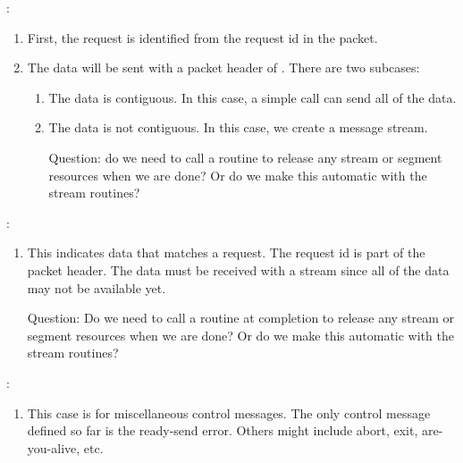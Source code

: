 :
\begin{enumerate}
\item First, the request is identified from the request id in the packet.

\item The data will be sent with a packet header of
  .  There are two subcases:
  \begin{enumerate}
  \item The data is contiguous.  In this case, a simple 
    call can send all of the data.

  \item The data is not contiguous.  In this case, we create a message
    stream.  

   Question: do we need to call a routine to release any stream or segment
   resources when we are done?  Or do we make this automatic with the stream
   routines? 

  \end{enumerate}
\end{enumerate}

:
\begin{enumerate}
\item This indicates data that matches a request.  The request id is part of
  the packet header.  The data must be received with a stream since all of the
  data may not be available yet.  

  Question: Do we need to call a routine at completion to release any stream
  or segment resources when we are done? Or do we make this automatic with the
  stream routines?

\end{enumerate}

:
\begin{enumerate}
\item This case is for miscellaneous control messages.  The only control
  message defined so far is the ready-send error.  Others might include abort,
  exit, are-you-alive, etc.
\end{enumerate}

\ifcodefirst
\else
{}
\fi


\ifcodefirst
{}
\fi

